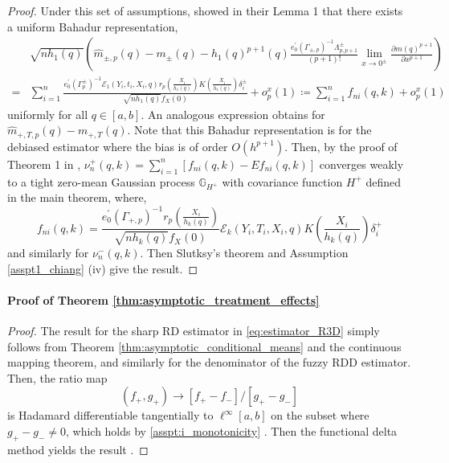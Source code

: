 \documentclass[12pt]{article}
\newcommand{\sumn}{\sum_{i=1}^n}
\newcommand{\dpar}[2]{\frac{\partial #1}{\partial #2}}
\begin{document}
\begin{proof}
Under this set of assumptions, \citet{chiang2019robust} showed in their Lemma 1 that there exists a uniform Bahadur representation, 
$$
\begin{aligned}
& \sqrt{n h_{1}\left(q\right)}\left(\hat{m}_{\pm, p}\left(q\right)-m_{\pm}(q)-h_1(q)^{p+1}\left(q\right) \frac{e_0^{\prime}\left(\Gamma_{\pm, p}\right)^{-1} \Lambda_{p, p+1}^{ \pm}}{(p+1)!} \lim_{x \to 0^{\pm}}\dpar{m(q)^{p+1}}{x^{p+1}}\right)   \\
= & \sum_{i=1}^n \frac{e_0^{\prime}\left(\Gamma_p^{ \pm}\right)^{-1} \mathcal{E}_1\left(Y_i, t_i, X_i, q\right) r_p\left(\frac{X_i}{h_{1}\left(q\right)}\right) K\left(\frac{X_i}{h_{1}\left(q\right)}\right) \delta_i^{ \pm}}{\sqrt{n h_{1}\left(q\right)} f_X(0)}+o_p^x(1) \coloneqq \sumn f_{ni}(q,k) + o_p^x(1)
\end{aligned}
$$
uniformly for all $q \in [a,b]$. An analogous expression obtains for $\hat{m}_{+,T,p}(q) - m_{+,T}(q)$. Note that this Bahadur representation is for the debiased estimator where the bias is of order $O(h^{p+1})$.
Then, by the proof of Theorem 1 in \citet{chiang2019robust}, $\nu^{+}_n(q, k) = \sum_{i=1}^n\left[f_{n i}(q, k)-E f_{n i}(q, k)\right]$ converges weakly to a tight zero-mean Gaussian process $\mathbb{G}_{H^+}$ with covariance function $H^+$ defined in the main theorem, where,
 \[ f_{n i}(q, k)=\frac{e_0^{\prime}\left(\Gamma_{+,p}\right)^{-1} r_p\left(\frac{X_i}{h_k\left(q\right)}\right)}{\sqrt{n h_{k}\left(q\right)} f_X(0)} \mathcal{E}_k\left(Y_i, T_i, X_i, q\right) K\left(\frac{X_i}{h_k\left(q\right)}\right) \delta_i^+\]
 and similarly for $\nu^-_n(q,k)$. Then Slutksy's theorem and Assumption \ref{asspt1_chiang} (iv) give the result. 
\end{proof}

\paragraph{Proof of Theorem \ref{thm:asymptotic_treatment_effects}}
\begin{proof}
The result for the sharp RD estimator in \eqref{eq:estimator_R3D} simply follows from Theorem \ref{thm:asymptotic_conditional_means} and the continuous mapping theorem, and similarly for the denominator of the fuzzy RDD estimator. Then, the ratio map
$$
\left(f_{+}, g_{+}\right) \to\left[f_{+}-f_{-}\right] /\left[g_{+}-g_{-}\right]
$$
is Hadamard differentiable tangentially to $\ell^{\infty}[a,b]$ on the subset where $g_{+}-g_{-} \neq 0$, which holds by \ref{asspt:i_monotonicity} \citep[Lemma 3]{chiang2019robust}. Then the functional delta method yields the result \citep[Lemma 3.9.3]{vaart1996weak}.
\end{proof}
\end{document}
